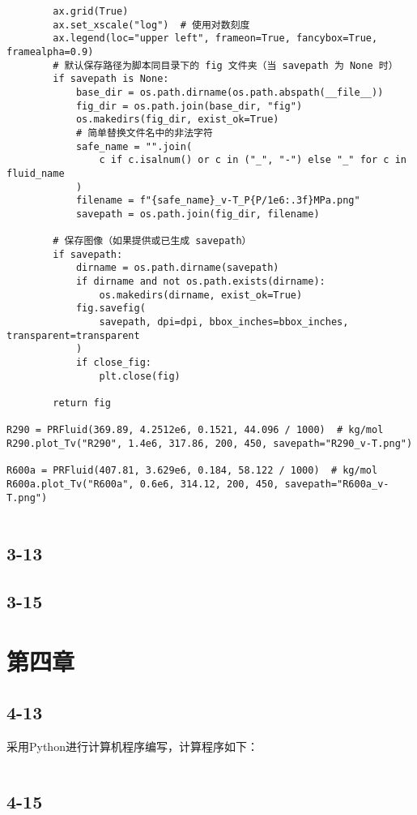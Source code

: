 \documentclass[12pt,a4paper]{article}
\begin{document}
\begin{lstlisting}
        ax.grid(True)
        ax.set_xscale("log")  # 使用对数刻度
        ax.legend(loc="upper left", frameon=True, fancybox=True, framealpha=0.9)
        # 默认保存路径为脚本同目录下的 fig 文件夹（当 savepath 为 None 时）
        if savepath is None:
            base_dir = os.path.dirname(os.path.abspath(__file__))
            fig_dir = os.path.join(base_dir, "fig")
            os.makedirs(fig_dir, exist_ok=True)
            # 简单替换文件名中的非法字符
            safe_name = "".join(
                c if c.isalnum() or c in ("_", "-") else "_" for c in fluid_name
            )
            filename = f"{safe_name}_v-T_P{P/1e6:.3f}MPa.png"
            savepath = os.path.join(fig_dir, filename)

        # 保存图像（如果提供或已生成 savepath）
        if savepath:
            dirname = os.path.dirname(savepath)
            if dirname and not os.path.exists(dirname):
                os.makedirs(dirname, exist_ok=True)
            fig.savefig(
                savepath, dpi=dpi, bbox_inches=bbox_inches, transparent=transparent
            )
            if close_fig:
                plt.close(fig)

        return fig

R290 = PRFluid(369.89, 4.2512e6, 0.1521, 44.096 / 1000)  # kg/mol
R290.plot_Tv("R290", 1.4e6, 317.86, 200, 450, savepath="R290_v-T.png")

R600a = PRFluid(407.81, 3.629e6, 0.184, 58.122 / 1000)  # kg/mol
R600a.plot_Tv("R600a", 0.6e6, 314.12, 200, 450, savepath="R600a_v-T.png")


\end{lstlisting}

\subsection*{3-13}

\subsection*{3-15}

\vspace{1cm}

\section*{第四章}

\subsection*{4-13}
采用Python进行计算机程序编写，计算程序如下：
\begin{lstlisting}

\end{lstlisting}
\subsection*{4-15}
\end{document}
